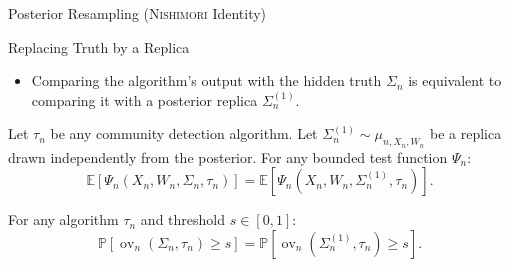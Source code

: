 \documentclass[A4,svgnames,9pt,aspectratio=169]{beamer}
\newcommand{\ov}{\operatorname{ov}}
\begin{document}
\begin{frame}{Posterior Resampling (\textsc{Nishimori} Identity)}
  \begin{block}{Replacing Truth by a Replica}
    \begin{itemize}
      \item Comparing the algorithm's output with the hidden truth $\Sigma_n$ is equivalent to comparing it with a posterior replica $\Sigma_n^{(1)}$.
    \end{itemize}
  \end{block}
  \begin{theorem}
    Let $\tau_n$ be any community detection algorithm. Let $\Sigma_n^{(1)} \sim \mu_{n, X_n, W_n}$ be a replica drawn independently from the posterior. For any bounded test function $\Psi_n$:
    \begin{equation*}
        \mathbb{E}\left[\Psi_n(X_n, W_n, \Sigma_n, \tau_n)\right]
        =
        \mathbb{E}\left[\Psi_n(X_n, W_n, \Sigma_n^{(1)}, \tau_n)\right].
    \end{equation*}
  \end{theorem}
  \begin{corollary}
    For any algorithm $\tau_n$ and threshold $s \in [0, 1]$:
    \begin{equation*}
        \mathbb{P}\left[\ov_n(\Sigma_n, \tau_n) \ge s\right]
        =
        \mathbb{P}\left[\ov_n(\Sigma_n^{(1)}, \tau_n) \ge s\right].
    \end{equation*}
  \end{corollary}
\end{frame}
\end{document}
